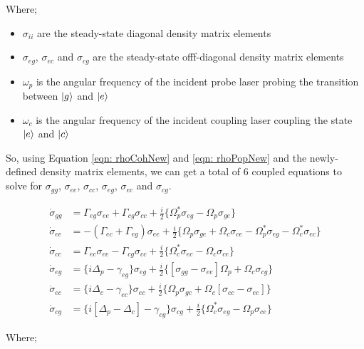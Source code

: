 Where;

\begin{itemize}
    \item $\sigma_{ii}$ are the steady-state diagonal density matrix elements
    \item $\sigma_{eg}$, $\sigma_{ec}$ and $\sigma_{cg}$ are the steady-state offf-diagonal density matrix elements
    \item $\omega_{p}$ is the angular frequency of the incident probe laser probing the transition between $\ket{g}$ and $\ket{e}$
    \item $\omega_{c}$ is the angular frequency of the incident coupling laser coupling the state $\ket{e}$ and $\ket{c}$
\end{itemize}


So, using Equation \ref{eqn: rhoCohNew} and \ref{eqn: rhoPopNew} and the newly-defined density matrix elements, we can get a total of $6$ coupled equations to solve for $\sigma_{gg}$, $\sigma_{ee}$, $\sigma_{cc}$, $\sigma_{eg}$, $\sigma_{ec}$ and $\sigma_{cg}$.

\begin{align}
    \Dot{\sigma}_{gg} &= \Gamma_{eg} \sigma_{ee} + \Gamma_{cg} \sigma_{cc} + \frac{i}{2} \{\Omega_{p}^{*} \sigma_{eg} - \Omega_{p} \sigma_{ge}\} \label{eqn: 1st}\\
    \Dot{\sigma}_{ee} &= -(\Gamma_{ec} + \Gamma_{eg}) \sigma_{ee} + \frac{i}{2} \{\Omega_{p} \sigma_{ge} + \Omega_{c} \sigma_{ce} - \Omega_{p}^{*} \sigma_{eg} - \Omega_{c}^{*} \sigma_{ec}\}\\
    \Dot{\sigma}_{cc} &= \Gamma_{ec} \sigma_{ee} - \Gamma_{cg} \sigma_{cc} + \frac{i}{2} \{\Omega_{c}^{*} \sigma_{ec} - \Omega_{c} \sigma_{ce}\}\\
    \Dot{\sigma}_{eg} &= \{i \Delta_{p} - \gamma_{eg}\}\sigma_{eg} + \frac{i}{2} \{[\sigma_{gg} - \sigma_{ee}] \Omega_{p} + \Omega_{c} \sigma_{cg}\}\\
    \Dot{\sigma}_{ec} &= \{i \Delta_{c} - \gamma_{ec}\} \sigma_{ec} + \frac{i}{2} \{\Omega_{p} \sigma_{gc} + \Omega_{c} [\sigma_{cc} - \sigma_{ee}]\}\\
    \Dot{\sigma}_{cg} &= \{i[\Delta_{p} - \Delta_{c}] - \gamma_{cg}\}\sigma_{cg} + \frac{i}{2} \{\Omega_{c}^{*} \sigma_{eg} - \Omega_{p} \sigma_{ce}\} \label{eqn: final}
\end{align}

Where;

